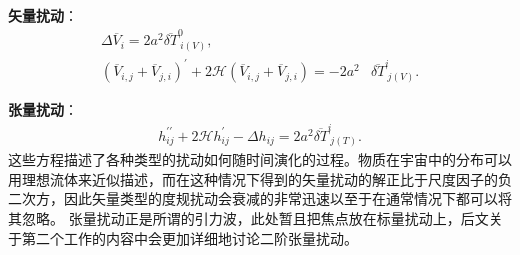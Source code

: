 \textbf{矢量扰动}：
\begin{align}
  \label{eq:equation-gauge-vector-perturbation}
  \Delta\overline{V}_{i}=2a^2\overline{\delta T}^{0}_{\ i(V)}, \\  
  {\left(\overline{V}_{i,j}+\overline{V}_{j,i}\right)}^{\prime} + 
  2\mathcal{H}{\left(\overline{V}_{i,j}+\overline{V}_{j,i}\right)} = 
  -2a^2&\overline{\delta T}^{i}_{\ j(V)}.
\end{align}

\textbf{张量扰动}：
\begin{align}
  \label{eq:equation-gauge-tensor-perturbation}
  h^{\prime\prime}_{ij}+2\mathcal{H}h^\prime_{ij}-\Delta h_{ij}=
  2a^2\overline{\delta T}^{i}_{\ j(T)}.
\end{align}
这些方程描述了各种类型的扰动如何随时间演化的过程。物质在宇宙中的分布可以用理想流体来近似描述，而在这种情况下得到的矢量扰动的解正比于尺度因子的负二次方，因此矢量类型的度规扰动会衰减的非常迅速以至于在通常情况下都可以将其忽略。
张量扰动正是所谓的引力波，此处暂且把焦点放在标量扰动上，后文关于第二个工作的内容中会更加详细地讨论二阶张量扰动。

